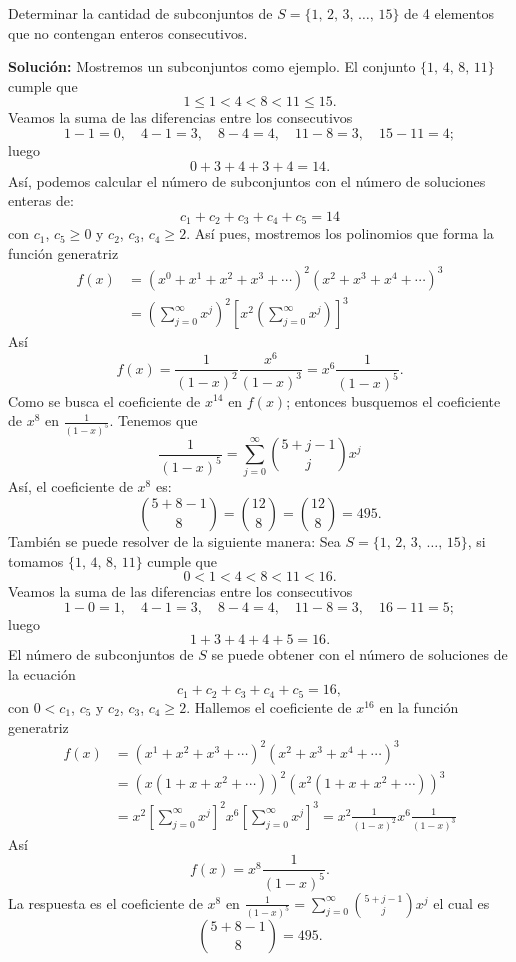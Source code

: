 \begin{myexample}
    Determinar la cantidad de subconjuntos de $S = \{ 1, \, 2, \, 3, \, \dots, \, 15 \}$ de 4 elementos que no contengan enteros consecutivos.
    
    \tcblower
    \textbf{\color{jblueleft}Solución:} Mostremos un subconjuntos como ejemplo. El conjunto $\{1, \, 4, \, 8, \, 11 \}$ cumple que
    $$1 \leq 1 < 4 <8 < 11 \leq 15.$$
    Veamos la suma de las diferencias entre los consecutivos
    $$1-1=0, \quad 4-1=3, \quad 8-4=4, \quad 11-8=3, \quad 15-11=4;$$
    luego
    $$0 + 3 + 4 + 3 + 4 = 14.$$
    Así, podemos calcular el número de subconjuntos con el número de soluciones enteras de:
    $$c_1 + c_2 + c_3 + c_4 + c_5 = 14$$
    con $c_1$, $c_5 \geq 0$ y $c_2$, $c_3$, $c_4 \geq 2$. Así pues, mostremos los polinomios que forma la función generatriz
    \begin{align*}
        f(x) & = \left( x^{0} + x^{1} + x^{2} + x^{3} + \cdots \right)^{2} \left( x^{2} + x^{3} + x^{4} + \cdots \right)^{3} \\
        & = \left( \sum_{j=0}^{\infty} x^{j} \right)^{2} \left[ x^{2} \left( \sum_{j=0}^{\infty} x^{j} \right) \right]^{3}
    \end{align*}
    Así
    $$f(x) = \frac{1}{(1-x)^{2}} \frac{x^{6}}{(1-x)^{3}} = x^{6} \frac{1}{(1-x)^{5}}.$$
    Como se busca el coeficiente de $x^{14}$ en $f(x)$; entonces busquemos el coeficiente de $x^{8}$ en $\displaystyle \frac{1}{(1-x)^{5}}$. Tenemos que
    $$\frac{1}{(1-x)^{5}} = \sum_{j=0}^{\infty} \binom{5+j-1}{j} x^{j}$$
    Así, el coeficiente de $x^{8}$ es:
    $$\binom{5+8-1}{8} = \binom{12}{8} = \binom{12}{8} = 495.$$
    También se puede resolver de la siguiente manera: Sea $S = \{ 1, \, 2, \, 3, \, \dots, \, 15 \}$, si tomamos $\{1, \, 4, \, 8, \, 11 \}$ cumple que
    $$0 < 1 < 4 < 8 < 11 <16.$$
    Veamos la suma de las diferencias entre los consecutivos
    $$1-0=1, \quad 4-1=3, \quad 8-4=4, \quad 11-8=3, \quad 16-11=5;$$
    luego
    $$1 + 3 + 4 + 4 + 5 = 16.$$
    El número de subconjuntos de $S$ se puede obtener con el número de soluciones de la ecuación
    $$c_1 + c_2 + c_3 + c_4 + c_5 = 16,$$
    con $0 < c_1$, $c_5$ y $c_2$, $c_3$, $c_4 \geq 2$. Hallemos el coeficiente de $x^{16}$ en la función generatriz
    \begin{align*}
        f(x) & = \left( x^{1} + x^{2} + x^{3} + \cdots \right)^{2} \left( x^{2} + x^{3} + x^{4} + \cdots \right)^{3} \\
        & = \left( x \left( 1 + x + x^{2} + \cdots \right) \right)^{2} \left( x^{2} \left( 1 + x + x^{2} + \cdots \right) \right)^{3} \\
        & = x^{2} \left[ \sum_{j=0}^{\infty} x^{j} \right]^{2} x^{6} \left[ \sum_{j=0}^{\infty} x^{j} \right]^{3} = x^{2} \frac{1}{(1-x)^{2}} x^{6} \frac{1}{(1-x)^{3}}
    \end{align*}
    Así
    $$f(x) = x^{8} \frac{1}{(1-x)^{5}}.$$
    La respuesta es el coeficiente de $x^{8}$ en $\displaystyle \frac{1}{(1-x)^{5}} = \sum_{j=0}^{\infty} \binom{5+j-1}{j} x^{j}$ el cual es
    $$\binom{5+8-1}{8} = 495.$$
\end{myexample}

